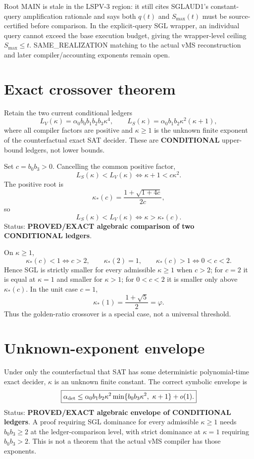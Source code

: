 \documentclass[11pt]{article}
\begin{document}
Root MAIN is stale in the LSPV-3 region: it still cites SGLAUD1's constant-query amplification rationale and says both \(q(t)\) and \(S_{\max}(t)\) must be source-certified before comparison. In the explicit-query SGL wrapper, an individual query cannot exceed the base execution budget, giving the wrapper-level ceiling \(S_{\max}\le t\). SAME_REALIZATION matching to the actual vMS reconstruction and later compiler/accounting exponents remain open.

\section*{Exact crossover theorem}
Retain the two current conditional ledgers
\[
L_V(\kappa)=\alpha_0 b_0b_1b_2b_3\kappa^4,\qquad
L_S(\kappa)=\alpha_0 b_1b_2\kappa^2(\kappa+1),
\]
where all compiler factors are positive and \(\kappa\ge1\) is the unknown finite exponent of the counterfactual exact SAT decider. These are \textbf{CONDITIONAL} upper-bound ledgers, not lower bounds.

Set \(c=b_0b_3>0\). Cancelling the common positive factor,
\[
L_S(\kappa)<L_V(\kappa)\iff \kappa+1<c\kappa^2.
\]
The positive root is
\[
\boxed{\kappa_*(c)=\frac{1+\sqrt{1+4c}}{2c}},
\]
so
\[
\boxed{L_S(\kappa)<L_V(\kappa)\iff \kappa>\kappa_*(c).}
\]
Status: \textbf{PROVED/EXACT algebraic comparison of two CONDITIONAL ledgers}.

On \(\kappa\ge1\),
\[
\kappa_*(c)<1\iff c>2,\qquad \kappa_*(2)=1,\qquad \kappa_*(c)>1\iff0<c<2.
\]
Hence SGL is strictly smaller for every admissible \(\kappa\ge1\) when \(c>2\); for \(c=2\) it is equal at \(\kappa=1\) and smaller for \(\kappa>1\); for \(0<c<2\) it is smaller only above \(\kappa_*(c)\). In the unit case \(c=1\),
\[
\kappa_*(1)=\frac{1+\sqrt5}{2}=\varphi.
\]
Thus the golden-ratio crossover is a special case, not a universal threshold.

\section*{Unknown-exponent envelope}
Under only the counterfactual that SAT has some deterministic polynomial-time exact decider, \(\kappa\) is an unknown finite constant. The correct symbolic envelope is
\[
\boxed{\alpha_{\rm det}\le \alpha_0b_1b_2\kappa^2\min\{b_0b_3\kappa^2,\ \kappa+1\}+o(1).}
\]
Status: \textbf{PROVED/EXACT algebraic envelope of CONDITIONAL ledgers}. A proof requiring SGL dominance for every admissible \(\kappa\ge1\) needs \(b_0b_3\ge2\) at the ledger-comparison level, with strict dominance at \(\kappa=1\) requiring \(b_0b_3>2\). This is not a theorem that the actual vMS compiler has those exponents.
\end{document}
